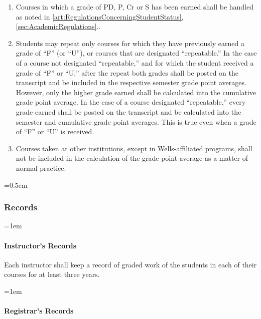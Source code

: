 \documentclass{manual}
\let\oldsubsubsection\subsubsection
\renewcommand\subsubsection{\leftskip=0.5em\oldsubsubsection}
\let\oldparagraph\paragraph
\renewcommand\paragraph{\leftskip=1em\oldparagraph}
\begin{document}
	\begin{enumerate}[label=\arabic*]
	\item Courses in which a grade of PD, P, Cr or S has been earned shall be handled as noted in \cref{art:RegulationsConcerningStudentStatus}, \cref{sec:AcademicRegulations}..
	\item Students may repeat only courses for which they have previously earned a grade  of ``F'' (or ``U''), or courses that are designated ``repeatable.'' In the case of a course not designated ``repeatable,'' and for which the student received a grade of ``F'' or ``U,'' after the repeat both grades shall be posted on the transcript and be included in the respective semester grade point averages. However, only the higher grade earned shall be calculated into the cumulative grade point average. In the case of a course designated ``repeatable,'' every grade earned shall be posted on the transcript and be calculated into the semester and cumulative grade point averages. This is true even when a grade of ``F'' or ``U'' is received.
	\item Courses taken at other institutions, except in Wells-affiliated programs, shall not be included in the calculation of the grade point average as a matter of normal practice.
	\end{enumerate}

\subsubsection{Records}

\paragraph{Instructor's Records}

Each instructor shall keep a record of graded work of the students in each of their courses for at least three years.

\paragraph{Registrar's Records}
\end{document}
